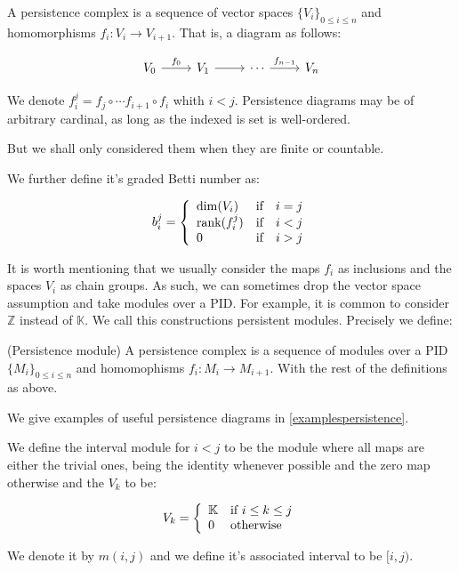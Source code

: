 \begin{definition}
A persistence complex is a sequence of vector spaces 
$\{V_i\}_{0\leq i \leq n}$ and homomorphisms
 $f_i:V_i\to V_{i+1}$. That is, a diagram
as follows:


$$
\begin{tikzcd}
V_0 \arrow[r,"f_0"]
& V_1 \arrow[r]
& \cdots\arrow[r,"f_{n-1}"]
& V_n
\end{tikzcd}
$$


We denote $f_i^j
=
f_j\circ\cdots f_{i+1}\circ f_i
$ whith $i<j$.
Persistence diagrams may be of arbitrary cardinal,
as long as the indexed is set is well-ordered.

But we shall only considered them when they are finite or countable.

We further define it's graded Betti number as:

$$
b_i^j
=\left\{
\begin{array}{l c c}
\dim(V_i) & \text{if} & i=j\\
\text{rank}(f_i^j) & \text{if} & i<j\\
0 & \text{if} & i>j\\
\end{array}
\right.
$$

\end{definition}

It is worth mentioning that we usually consider the maps $f_i$
as inclusions and the spaces $V_i$ as chain groups. As such, we
can sometimes drop the vector space assumption and take 
modules over a PID. For example, it is common to consider $\mathbb{Z}$
instead of $\mathbb{K}$. We call this constructions
persistent modules. Precisely we define:

\begin{definition}(Persistence module)
A persistence complex is a sequence of modules
over a PID
$\{M_i\}_{0\leq i \leq n}$ and homomophisms $f_i:M_i\to M_{i+1}$. 
With the rest of the definitions as above.

\end{definition}

We give examples of useful persistence diagrams in \ref{examplespersistence}.

\begin{example}
We define the interval module for $i<j$
to be the module where all maps are either the trivial ones, 
being the identity whenever possible and the zero map otherwise and 
the $V_k$ to be:

$$
V_k
=
\left\{
\begin{array}{l l}
\mathbb{K} & \text{if } i\leq k\leq j\\
0 & \text{otherwise} 
\end{array}
\right.
$$


We denote it by $m(i,j)$
and we define it's associated interval to be $[i,j)$.

\end{example}



